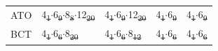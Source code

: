 \documentclass[preprint,numrefs,noinfo,sort&compress]{elsarticle}
\providecommand{\DIFadd}[1]{{\protect\color{blue}\uwave{#1}}} %
\providecommand{\DIFdel}[1]{{\protect\color{red}\sout{#1}}}                      %
\providecommand{\DIFaddFL}[1]{\DIFadd{#1}} %
\providecommand{\DIFdelFL}[1]{\DIFdel{#1}} %
\providecommand{\DIFaddbeginFL}{} %
\providecommand{\DIFaddendFL}{} %
\providecommand{\DIFdelbeginFL}{} %
\providecommand{\DIFdelendFL}{} %
\newcommand{\DIFscaledelfig}{0.5}
\newlength{\DIFdelgraphicswidth} %
\newlength{\DIFdelgraphicsheight} %
\newcommand{\DIFaddincludegraphics}[2][]{{\color{blue}\fbox{\DIFOincludegraphics[#1]{#2}}}} %
\newcommand{\DIFdelincludegraphics}[2][]{%
\sbox{\DIFdelgraphicsbox}{\DIFOincludegraphics[#1]{#2}}%
\settoboxwidth{\DIFdelgraphicswidth}{\DIFdelgraphicsbox} %
\settoboxtotalheight{\DIFdelgraphicsheight}{\DIFdelgraphicsbox} %
\scalebox{\DIFscaledelfig}{%
\parbox[b]{\DIFdelgraphicswidth}{\usebox{\DIFdelgraphicsbox}\\[-\baselineskip] \rule{\DIFdelgraphicswidth}{0em}}\llap{\resizebox{\DIFdelgraphicswidth}{\DIFdelgraphicsheight}{%
\setlength{\unitlength}{\DIFdelgraphicswidth}%
\begin{picture}(1,1)%
\thicklines\linethickness{2pt} %
{\color[rgb]{1,0,0}\put(0,0){\framebox(1,1){}}}%
{\color[rgb]{1,0,0}\put(0,0){\line( 1,1){1}}}%
{\color[rgb]{1,0,0}\put(0,1){\line(1,-1){1}}}%
\end{picture}%
}\hspace*{3pt}}} %
} %
\DeclareRobustCommand{\DIFaddbeginFL}{\DIFOaddbeginFL \let\includegraphics\DIFaddincludegraphics} %
\DeclareRobustCommand{\DIFaddendFL}{\DIFOaddendFL \let\includegraphics\DIFOincludegraphics} %
\DeclareRobustCommand{\DIFdelbeginFL}{\DIFOdelbeginFL \let\includegraphics\DIFdelincludegraphics} %
\DeclareRobustCommand{\DIFdelendFL}{\DIFOaddendFL \let\includegraphics\DIFOincludegraphics} %
\begin{document}
\begin{table}
\begin{threeparttable}
{\begin{tabular}{lllll}
ATO & 4\DIFdelbeginFL \DIFdelFL{\textsubscript{1}\(\cdot\)}\DIFdelendFL \DIFaddbeginFL \DIFaddFL{\(_{\text{1}} \cdot\)}\DIFaddendFL 6\DIFdelbeginFL \DIFdelFL{\textsubscript{9}\(\cdot\)}\DIFdelendFL \DIFaddbeginFL \DIFaddFL{\(_{\text{9}} \cdot\)}\DIFaddendFL 8\DIFdelbeginFL \DIFdelFL{\textsubscript{8}\(\cdot\)}\DIFdelendFL \DIFaddbeginFL \DIFaddFL{\(_{\text{8}} \cdot\)}\DIFaddendFL 12\DIFdelbeginFL \DIFdelFL{\textsubscript{20} }\DIFdelendFL \DIFaddbeginFL \DIFaddFL{\(_{\text{20}}\) }\DIFaddendFL & 4\DIFdelbeginFL \DIFdelFL{\textsubscript{1}\(\cdot\)}\DIFdelendFL \DIFaddbeginFL \DIFaddFL{\(_{\text{1}} \cdot\)}\DIFaddendFL 6\DIFdelbeginFL \DIFdelFL{\textsubscript{9}\(\cdot\)}\DIFdelendFL \DIFaddbeginFL \DIFaddFL{\(_{\text{9}} \cdot\)}\DIFaddendFL 12\DIFdelbeginFL \DIFdelFL{\textsubscript{20} }\DIFdelendFL \DIFaddbeginFL \DIFaddFL{\(_{\text{20}}\) }\DIFaddendFL & 4\DIFdelbeginFL \DIFdelFL{\textsubscript{1}\(\cdot\)}\DIFdelendFL \DIFaddbeginFL \DIFaddFL{\(_{\text{1}} \cdot\)}\DIFaddendFL 6\DIFdelbeginFL \DIFdelFL{\textsubscript{9} }\DIFdelendFL \DIFaddbeginFL \DIFaddFL{\(_{\text{9}}\) }\DIFaddendFL & 4\DIFdelbeginFL \DIFdelFL{\textsubscript{1}\(\cdot\)}\DIFdelendFL \DIFaddbeginFL \DIFaddFL{\(_{\text{1}} \cdot\)}\DIFaddendFL 6\DIFdelbeginFL \DIFdelFL{\textsubscript{9}}\DIFdelendFL \DIFaddbeginFL \DIFaddFL{\(_{\text{9}}\)}\DIFaddendFL \\
BCT & 4\DIFdelbeginFL \DIFdelFL{\textsubscript{1}\(\cdot\)}\DIFdelendFL \DIFaddbeginFL \DIFaddFL{\(_{\text{1}} \cdot\)}\DIFaddendFL 6\DIFdelbeginFL \DIFdelFL{\textsubscript{6}\(\cdot\)}\DIFdelendFL \DIFaddbeginFL \DIFaddFL{\(_{\text{6}} \cdot\)}\DIFaddendFL 8\DIFdelbeginFL \DIFdelFL{\textsubscript{20} }\DIFdelendFL \DIFaddbeginFL \DIFaddFL{\(_{\text{20}}\) }\DIFaddendFL & 4\DIFdelbeginFL \DIFdelFL{\textsubscript{1}\(\cdot\)}\DIFdelendFL \DIFaddbeginFL \DIFaddFL{\(_{\text{1}} \cdot\)}\DIFaddendFL 6\DIFdelbeginFL \DIFdelFL{\textsubscript{6}\(\cdot\)}\DIFdelendFL \DIFaddbeginFL \DIFaddFL{\(_{\text{6}} \cdot\)}\DIFaddendFL 8\DIFdelbeginFL \DIFdelFL{\textsubscript{12} }\DIFdelendFL \DIFaddbeginFL \DIFaddFL{\(_{\text{12}}\) }\DIFaddendFL & 4\DIFdelbeginFL \DIFdelFL{\textsubscript{1}\(\cdot\)}\DIFdelendFL \DIFaddbeginFL \DIFaddFL{\(_{\text{1}} \cdot\)}\DIFaddendFL 6\DIFdelbeginFL \DIFdelFL{\textsubscript{6} }\DIFdelendFL \DIFaddbeginFL \DIFaddFL{\(_{\text{6}}\) }\DIFaddendFL & 4\DIFdelbeginFL \DIFdelFL{\textsubscript{1}\(\cdot\)}\DIFdelendFL \DIFaddbeginFL \DIFaddFL{\(_{\text{1}} \cdot\)}\DIFaddendFL 6\DIFdelbeginFL \DIFdelFL{\textsubscript{6}}\DIFdelendFL \DIFaddbeginFL \DIFaddFL{\(_{\text{6}}\)}\DIFaddendFL \\

\end{tabular}}
\end{threeparttable}
\end{table}
\end{document}
